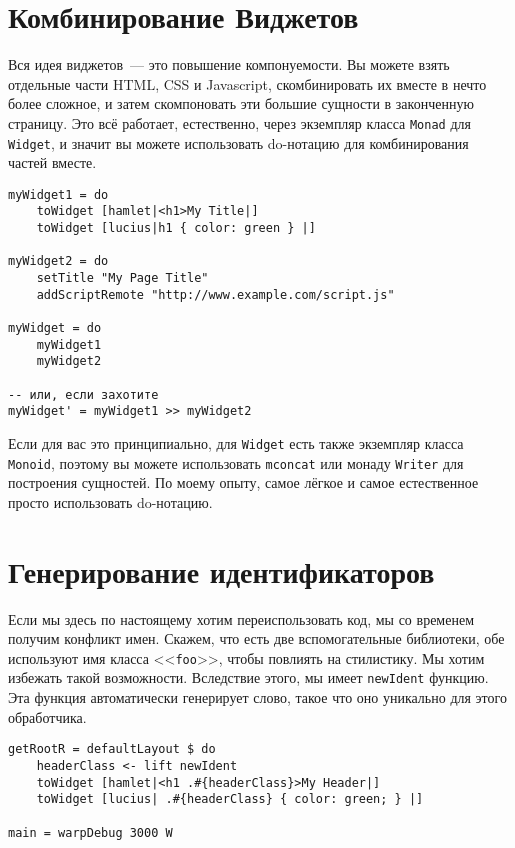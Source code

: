 \section{Комбинирование Виджетов}
Вся идея виджетов~--- это повышение компонуемости. Вы можете взять отдельные части HTML, CSS и Javascript, скомбинировать их вместе в нечто более сложное, и затем скомпоновать эти большие сущности в законченную страницу. Это всё работает, естественно, через экземпляр класса \lstinline'Monad' для \lstinline'Widget', и значит вы можете использовать do-нотацию для комбинирования частей вместе.
\begin{lstlisting}[title={Комбинирование Виджетов}]
myWidget1 = do
    toWidget [hamlet|<h1>My Title|]
    toWidget [lucius|h1 { color: green } |]

myWidget2 = do
    setTitle "My Page Title"
    addScriptRemote "http://www.example.com/script.js"

myWidget = do
    myWidget1
    myWidget2

-- или, если захотите
myWidget' = myWidget1 >> myWidget2
\end{lstlisting}
\begin{remark}
Если для вас это принципиально, для \lstinline'Widget' есть также экземпляр класса \lstinline'Monoid', поэтому вы можете использовать \lstinline'mconcat' или монаду \lstinline'Writer' для построения сущностей. По моему опыту, самое лёгкое и самое естественное просто использовать do-нотацию.
\end{remark}

\section{Генерирование идентификаторов}
Если мы здесь по настоящему хотим переиспользовать код, мы со временем получим конфликт имен. Скажем, что есть две вспомогательные библиотеки, обе используют имя класса <<\lstinline'foo'>>, чтобы повлиять на стилистику. Мы хотим избежать такой возможности. Вследствие этого, мы имеет \lstinline'newIdent' функцию.  Эта функция автоматически генерирует слово, такое что оно уникально для этого обработчика.


\begin{lstlisting}[title={Использование newIdent}]
getRootR = defaultLayout $ do
    headerClass <- lift newIdent
    toWidget [hamlet|<h1 .#{headerClass}>My Header|]
    toWidget [lucius| .#{headerClass} { color: green; } |]

main = warpDebug 3000 W
\end{lstlisting}

